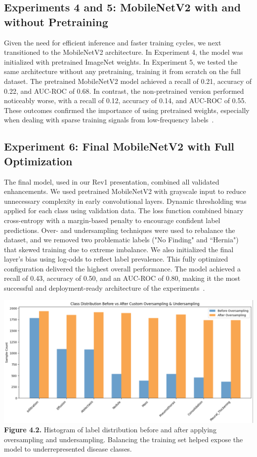 \documentclass[12pt]{article}
\begin{document}
\begin{multicols}{2}
\subsection{Experiments 4 and 5: MobileNetV2 with and without Pretraining}

Given the need for efficient inference and faster training cycles, we next transitioned to the MobileNetV2 architecture. In Experiment 4, the model was initialized with pretrained ImageNet weights. In Experiment 5, we tested the same architecture without any pretraining, training it from scratch on the full dataset.
The pretrained MobileNetV2 model achieved a recall of 0.21, accuracy of 0.22, and AUC-ROC of 0.68. In contrast, the non-pretrained version performed noticeably worse, with a recall of 0.12, accuracy of 0.14, and AUC-ROC of 0.55. These outcomes confirmed the importance of using pretrained weights, especially when dealing with sparse training signals from low-frequency labels~\cite{howard2019mobilenetv2}.

\subsection{Experiment 6: Final MobileNetV2 with Full Optimization}

The final model, used in our Rev1 presentation, combined all validated enhancements. We used pretrained MobileNetV2 with grayscale input to reduce unnecessary complexity in early convolutional layers. Dynamic thresholding was applied for each class using validation data. The loss function combined binary cross-entropy with a margin-based penalty to encourage confident label predictions. Over- and undersampling techniques were used to rebalance the dataset, and we removed two problematic labels ("No Finding" and ``Hernia") that skewed training due to extreme imbalance. We also initialized the final layer's bias using log-odds to reflect label prevalence.
This fully optimized configuration delivered the highest overall performance. The model achieved a recall of 0.43, accuracy of 0.50, and an AUC-ROC of 0.80, making it the most successful and deployment-ready architecture of the experiments~\cite{13}.

\begin{center}
    \includegraphics[width=\linewidth]{figure4.2.png}
    \textbf{Figure 4.2.} Histogram of label distribution before and after applying oversampling and undersampling. Balancing the training set helped expose the model to underrepresented disease classes.
\end{center}


\end{multicols}
\end{document}
